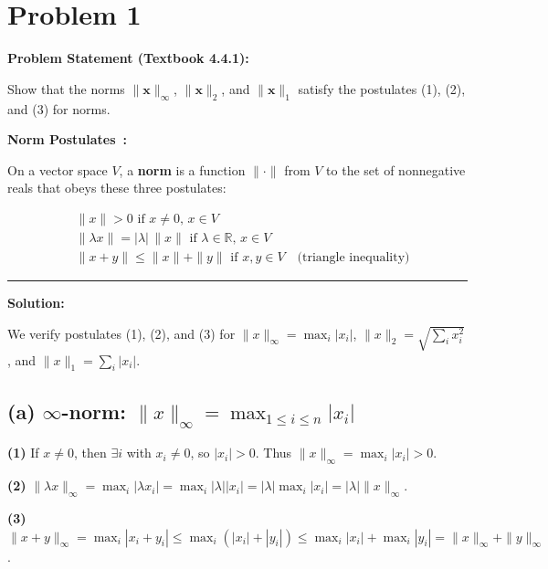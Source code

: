\clearpage
\section*{Problem 1}

\textbf{Problem Statement (Textbook 4.4.1):} 

Show that the norms $\|\mathbf{x}\|_\infty$, $\|\mathbf{x}\|_2$, and $\|\mathbf{x}\|_1$ satisfy the postulates (1), (2), and (3) for norms.

\vspace{0.5em}

\textbf{Norm Postulates~\cite{kincaid2009numerical, panchenko_448_notes}:}

On a vector space $V$, a \textbf{norm} is a function $\|\cdot\|$ from $V$ to the set of nonnegative reals that obeys these three postulates:

\begin{align*}
&\|x\| > 0 \text{ if } x \neq 0, \, x \in V \tag{1} \\
&\|\lambda x\| = |\lambda| \, \|x\| \text{ if } \lambda \in \mathbb{R}, \, x \in V \tag{2} \\
&\|x + y\| \leq \|x\| + \|y\| \text{ if } x, y \in V \quad \text{(triangle inequality)} \tag{3}
\end{align*}

\noindent\rule{\textwidth}{0.4pt}

\vspace{1em}

\textbf{Solution:}

We verify postulates (1), (2), and (3) for $\|x\|_\infty = \max_i |x_i|$, $\|x\|_2 = \sqrt{\sum_i x_i^2}$, and $\|x\|_1 = \sum_i |x_i|$.

\subsection*{(a) $\infty$-norm: $\|x\|_\infty = \max_{1 \leq i \leq n} |x_i|$}

\textbf{(1)} If $x \neq 0$, then $\exists i$ with $x_i \neq 0$, so $|x_i| > 0$. Thus $\|x\|_\infty = \max_i |x_i| > 0$.

\textbf{(2)} $\|\lambda x\|_\infty = \max_i |\lambda x_i| = \max_i |\lambda| |x_i| = |\lambda| \max_i |x_i| = |\lambda| \|x\|_\infty$.

\textbf{(3)} $\|x + y\|_\infty = \max_i |x_i + y_i| \leq \max_i (|x_i| + |y_i|) \leq \max_i |x_i| + \max_i |y_i| = \|x\|_\infty + \|y\|_\infty$.


